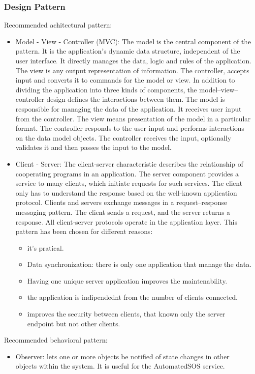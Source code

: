 \documentclass{article}
\begin{document}
\subsubsection{Design Pattern}
Recommended achitectural pattern:
\begin{itemize}
\item Model - View - Controller (MVC): The model is the central component of the pattern. It is the application's dynamic data structure, independent of the user interface. It directly manages the data, logic and rules of the application. The view is any output representation of information. The controller, accepts input and converts it to commands for the model or view.
In addition to dividing the application into three kinds of components, the model–view–controller design defines the interactions between them.
The model is responsible for managing the data of the application. It receives user input from the controller. The view means presentation of the model in a particular format. The controller responds to the user input and performs interactions on the data model objects. The controller receives the input, optionally validates it and then passes the input to the model.
\item Client - Server: The client-server characteristic describes the relationship of cooperating programs in an application. The server component provides a service to many clients, which initiate requests for such services. The client only has to understand the response based on the well-known application protocol. Clients and servers exchange messages in a request–response messaging pattern. The client sends a request, and the server returns a response. All client-server protocols operate in the application layer. This pattern has been chosen for different reasons:
\begin{itemize}
\item it’s pratical.
\item Data synchronization: there is only one application that manage the data.
\item Having one unique server application improves the maintenability.
\item the application is indipendednt from the number of clients connected.
\item improves the security between clients, that known only the server endpoint
but not other clients.
\end{itemize}
\end{itemize}
Recommended behavioral pattern:
\begin{itemize}
\item Observer: lets one or more objects be notified of state changes in other objects within the system. It is useful for the AutomatedSOS service.
\end{itemize}
\end{document}
